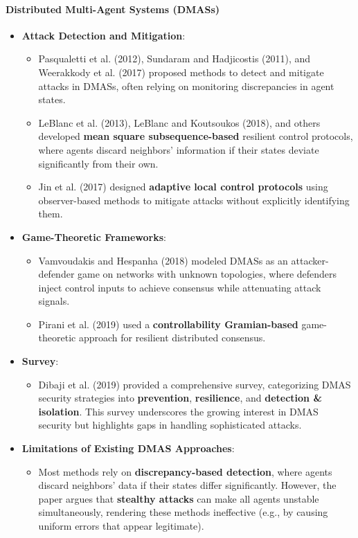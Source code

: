 \documentclass{article}
\begin{document}
\paragraph*{Distributed Multi-Agent Systems (DMASs)}
\begin{itemize}
    \item \textbf{Attack Detection and Mitigation}:
    \begin{itemize}
        \item Pasqualetti et al. (2012), Sundaram and Hadjicostis (2011), and Weerakkody et al. (2017) proposed methods to detect and mitigate attacks in DMASs, often relying on monitoring discrepancies in agent states.
        \item LeBlanc et al. (2013), LeBlanc and Koutsoukos (2018), and others developed \textbf{mean square subsequence-based} resilient control protocols, where agents discard neighbors’ information if their states deviate significantly from their own.
        \item Jin et al. (2017) designed \textbf{adaptive local control protocols} using observer-based methods to mitigate attacks without explicitly identifying them.
    \end{itemize}
    \item \textbf{Game-Theoretic Frameworks}:
    \begin{itemize}
        \item Vamvoudakis and Hespanha (2018) modeled DMASs as an attacker-defender game on networks with unknown topologies, where defenders inject control inputs to achieve consensus while attenuating attack signals.
        \item Pirani et al. (2019) used a \textbf{controllability Gramian-based} game-theoretic approach for resilient distributed consensus.
    \end{itemize}
    \item \textbf{Survey}:
    \begin{itemize}
        \item Dibaji et al. (2019) provided a comprehensive survey, categorizing DMAS security strategies into \textbf{prevention}, \textbf{resilience}, and \textbf{detection \& isolation}. This survey underscores the growing interest in DMAS security but highlights gaps in handling sophisticated attacks.
    \end{itemize}
    \item \textbf{Limitations of Existing DMAS Approaches}:
    \begin{itemize}
        \item Most methods rely on \textbf{discrepancy-based detection}, where agents discard neighbors’ data if their states differ significantly. However, the paper argues that \textbf{stealthy attacks} can make all agents unstable simultaneously, rendering these methods ineffective (e.g., by causing uniform errors that appear legitimate).

\end{itemize}
\end{itemize}
\end{document}

